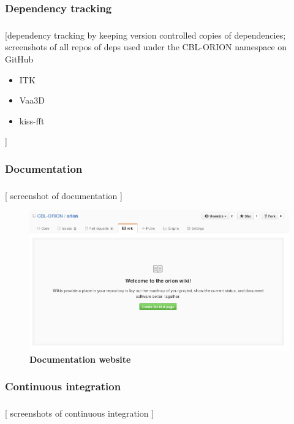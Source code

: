 \documentclass{beamer}
\begin{document}
\subsubsection{Dependency tracking}
\begin{frame}\frametitle{\subsubsecname}
	[dependency tracking by keeping version controlled copies
		of dependencies; screenshots of all repos of deps used under the CBL-ORION
	namespace on GitHub
	\begin{itemize}
		\item ITK
		\item Vaa3D
		\item kiss-fft
	\end{itemize}
	]
\end{frame}

\subsubsection{Documentation}
\begin{frame}\frametitle{\subsubsecname}
	[ screenshot of documentation ]
		\begin{figure}[tbp]
			\centering
			\includegraphics[width=1.0\textwidth]{gfx/doc_placeholder}
			\caption{\textbf{Documentation website}
			}\label{fig:doc-wiki}
		\end{figure}
\end{frame}


\subsubsection{Continuous integration}
\begin{frame}\frametitle{\subsecname}
	[
		{screenshots of continuous integration}
	]
\end{frame}
\end{document}
